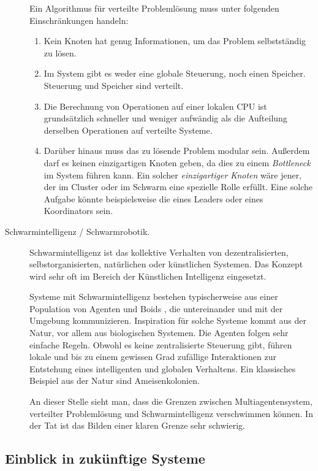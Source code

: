 \begin{description}
	Ein Algorithmus für verteilte Problemlösung muss unter folgenden Einschränkungen handeln:
	\begin{enumerate}
		\item Kein Knoten hat genug Informationen, um das Problem selbstständig zu lösen.
		
		\item Im System gibt es weder eine globale Steuerung, noch einen Speicher. Steuerung und Speicher sind verteilt.
		
		\item Die Berechnung von Operationen auf einer lokalen CPU ist grundsätzlich schneller und weniger aufwändig als die Aufteilung derselben Operationen auf verteilte Systeme.
		
		\item Darüber hinaus muss das zu lösende Problem modular sein. Außerdem darf es keinen einzigartigen Knoten geben, da dies zu einem \textit{Bottleneck} im System führen kann. Ein solcher \textit{einzigartiger Knoten} wäre jener, der im Cluster oder im Schwarm eine spezielle Rolle erfüllt. Eine solche Aufgabe könnte beispielsweise die eines Leaders oder eines Koordinators sein.
	\end{enumerate}
	
	
	\item[Schwarmintelligenz / Schwarmrobotik.] Schwarmintelligenz ist das kollektive Verhalten von dezentralisierten, selbstorganisierten, natürlichen oder künstlichen Systemen. Das Konzept wird sehr oft im Bereich der Künstlichen Intelligenz eingesetzt.
	
	Systeme mit Schwarmintelligenz bestehen typischerweise aus einer Population von Agenten und Boids \cite{Garnier07thebiological}, die untereinander und mit der Umgebung kommunizieren. Inspiration für solche Systeme kommt aus der Natur, vor allem aus biologischen Systemen. Die Agenten folgen sehr einfache Regeln. Obwohl es keine zentralisierte Steuerung gibt, führen lokale und bis zu einem gewissen Grad zufällige Interaktionen zur Entstehung eines intelligenten und globalen Verhaltens. Ein klassisches Beispiel aus der Natur sind Ameisenkolonien.
	
	An dieser Stelle sieht man, dass die Grenzen zwischen Multiagentensystem, verteilter Problemlösung und Schwarmintelligenz verschwimmen können. In der Tat ist das Bilden einer klaren Grenze sehr schwierig.
\end{description}

\subsection{Einblick in zukünftige Systeme}

